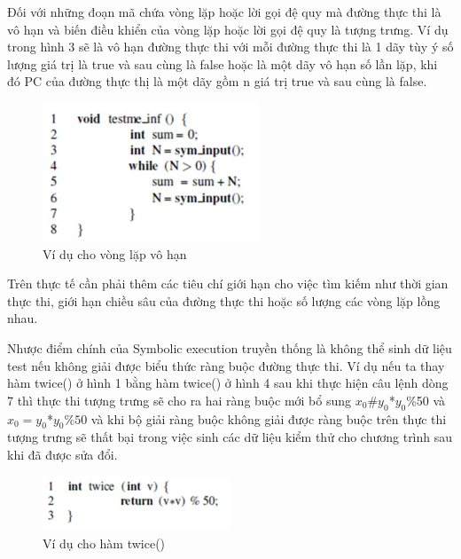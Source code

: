 \documentclass[12pt,a4paper]{article}
\begin{document}
\indent Đối với những đoạn mã chứa vòng lặp hoặc lời gọi đệ quy mà đường thực thi là vô hạn và biến điều khiển của vòng lặp hoặc lời gọi đệ quy là tượng trưng. Ví dụ trong hình 3 sẽ là vô hạn đường thực thi với mỗi đường thực thi là 1 dãy tùy ý số lượng giá trị là true và sau cùng là false hoặc là một dãy vô hạn số lần lặp, khi đó PC của đường thực thị là một dãy gồm n giá trị true và sau cùng là false.

\begin{figure}[ht]
\begin{center}
\includegraphics{hinhanh/hinh3}
\end{center}
\caption{Ví dụ cho vòng lặp vô hạn}
\end{figure}

\indent Trên thực tế cần phải thêm các tiêu chí giới hạn cho việc tìm kiếm như thời gian thực thi, giới hạn chiều sâu của đường thực thi hoặc số lượng các vòng lặp lồng nhau.

\indent Nhược điểm chính của Symbolic execution truyền thống là không thể sinh dữ liệu test nếu không giải được biểu thức ràng buộc đường thực thi. Ví dụ nếu ta thay hàm twice() ở hình 1 bằng hàm twice() ở hình 4 sau khi thực hiện câu lệnh dòng 7 thì thực thi tượng trưng sẽ cho ra hai ràng buộc mới bổ sung $x_0$\#$y_0$*$y_0$\%50 và $x_0=y_0$*$y_0$\%$50$ và khi bộ giải ràng buộc không giải được ràng buộc trên thực thi tượng trưng sẽ thất bại trong việc sinh các dữ liệu kiểm thử cho chương trình sau khi đã được sửa đổi.

\begin{figure}[ht]
\begin{center}
\includegraphics{hinhanh/hinh4}
\end{center}
\caption{Ví dụ cho hàm twice()}
\end{figure}
\end{document}

